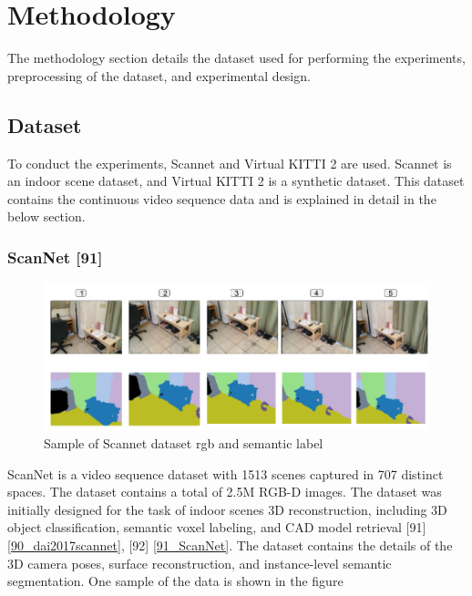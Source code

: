 

    \chapter{Methodology}
	\label{chap:methodology}
	
	The methodology section details the dataset used for performing the experiments, preprocessing of the dataset, and experimental design.

    \section{Dataset}
    
	To conduct the experiments, Scannet and Virtual KITTI 2 are used. Scannet is an indoor scene dataset, and Virtual KITTI 2 is a synthetic dataset. This dataset contains the continuous video sequence data and is explained in detail in the below section.
    
    \subsection{ScanNet [91]}

	\begin{figure}[h]
		\centering
		\includegraphics[width=17cm]{images/images_segm_scannet.png}
		\caption{Sample of Scannet dataset rgb and semantic label}
		\label{fig:sample_rgb_seg_scannet}
	\end{figure}
        
	ScanNet is a video sequence dataset with 1513 scenes captured in 707 distinct spaces. The dataset contains a total of 2.5M RGB-D images. The dataset was initially designed for the task of indoor scenes 3D reconstruction, including 3D object classification, semantic voxel labeling, and CAD model retrieval [91] \ref{90_dai2017scannet}, [92] \ref{91_ScanNet}. The dataset contains the details of the 3D camera poses, surface reconstruction, and instance-level semantic segmentation. One sample of the data is shown in the figure
	
